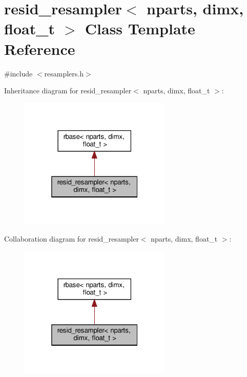 \hypertarget{classresid__resampler}{}\section{resid\+\_\+resampler$<$ nparts, dimx, float\+\_\+t $>$ Class Template Reference}
\label{classresid__resampler}


{\ttfamily \#include $<$resamplers.\+h$>$}



Inheritance diagram for resid\+\_\+resampler$<$ nparts, dimx, float\+\_\+t $>$\+:
\nopagebreak
\begin{figure}[H]
\begin{center}
\leavevmode
\includegraphics[width=205pt]{classresid__resampler__inherit__graph}
\end{center}
\end{figure}


Collaboration diagram for resid\+\_\+resampler$<$ nparts, dimx, float\+\_\+t $>$\+:
\nopagebreak
\begin{figure}[H]
\begin{center}
\leavevmode
\includegraphics[width=205pt]{classresid__resampler__coll__graph}
\end{center}
\end{figure}
